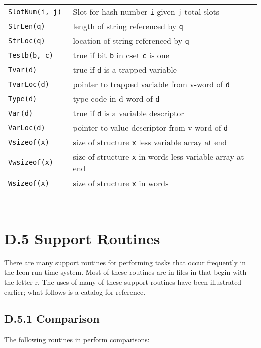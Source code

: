 {\begin{xtabular}{>{\hspace{1cm}\texttt\bgroup}l<{\egroup}@{\hspace{1cm}}p{11cm}}
SlotNum(i, j)     & Slot for hash number \texttt{i} given \texttt{j} total slots\\
StrLen(q)         & length of string referenced by \texttt{q}\\
StrLoc(q)         & location of string referenced by \texttt{q}\\
Testb(b, c)       & true if bit \texttt{b} in cset \texttt{c} is one\\
Tvar(d)           & true if \texttt{d} is a trapped variable\\
TvarLoc(d)        & pointer to trapped variable from v-word of \texttt{d}\\
Type(d)           & type code in d-word of \texttt{d}\\
Var(d)            & true if \texttt{d} is a variable descriptor\\
VarLoc(d)         & pointer to value descriptor from v-word of \texttt{d}\\
Vsizeof(x)        & size of structure \texttt{x} less variable array at end\\
Vwsizeof(x)       & size of structure \texttt{x} in words less variable array at end\\
Wsizeof(x)        & size of structure \texttt{x} in words\\
\end{xtabular}
}\\[1ex]

\section[D.5 Support Routines]{D.5 Support Routines}

There are many support routines for performing tasks that occur frequently in
the Icon run-time system. Most of these routines are in files in 
that begin with the letter r. The uses of many of these support routines have
been illustrated earlier; what follows is a catalog for reference.

\subsection[D.5.1 Comparison]{D.5.1 Comparison}

The following routines in  perform comparisons:

